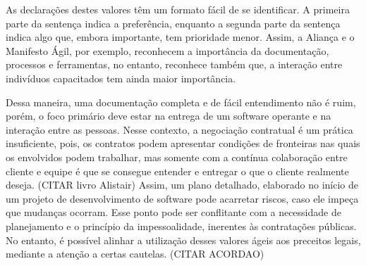 As declarações destes valores têm um formato fácil de se identificar. A primeira parte da sentença indica a preferência, enquanto a segunda parte da sentença indica algo que, embora importante, tem prioridade menor. Assim, a Aliança e o Manifesto Ágil, por exemplo, reconhecem a importância da documentação, processos e ferramentas, no entanto, reconhece também que, a interação entre indivíduos capacitados tem ainda maior importância.

Dessa maneira, uma documentação completa e de fácil entendimento não é ruim, porém, o foco primário deve estar na entrega de um software operante e na interação entre as pessoas. Nesse contexto, a negociação contratual é um prática insuficiente, pois, os contratos podem apresentar condições de fronteiras nas quais os envolvidos podem trabalhar, mas somente com a contínua colaboração entre cliente e equipe é que se consegue entender e entregar o que o cliente realmente deseja. (CITAR livro Alistair) Assim, um plano detalhado, elaborado no início de um projeto de desenvolvimento de software pode acarretar riscos, caso ele impeça que mudanças ocorram. Esse ponto pode ser conflitante com a necessidade de planejamento e o princípio da impessoalidade, inerentes às contratações públicas. No entanto, é possível alinhar a utilização desses valores ágeis aos preceitos legais, mediante a atenção a certas cautelas. (CITAR ACORDAO)

